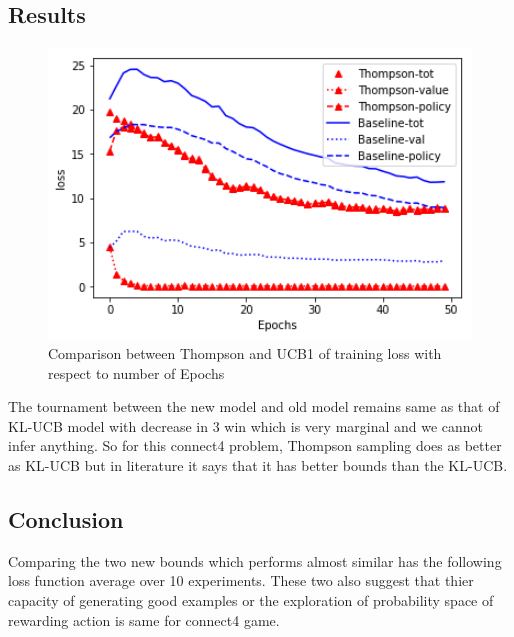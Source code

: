 \subsection{Results}
\begin{figure}
 	[htb]\centering
    \includegraphics[width=6in]{images/thompsonVSbaseline.png}
    \caption{Comparison between Thompson and  UCB1 of training loss with respect to number of Epochs }
  \label{fig:phase}
\end{figure}


The tournament between the new model and old model remains same as that of KL-UCB model with decrease in 3 win which is very marginal and we cannot infer anything. So for this connect4 problem, Thompson sampling does as better as KL-UCB but in literature it says that it has better bounds than the KL-UCB.

\subsection{Conclusion}
Comparing the two new bounds which performs almost similar has the following loss function average over 10 experiments. These two also suggest that thier capacity of generating good examples or the exploration of probability space of rewarding action is same for connect4 game.

